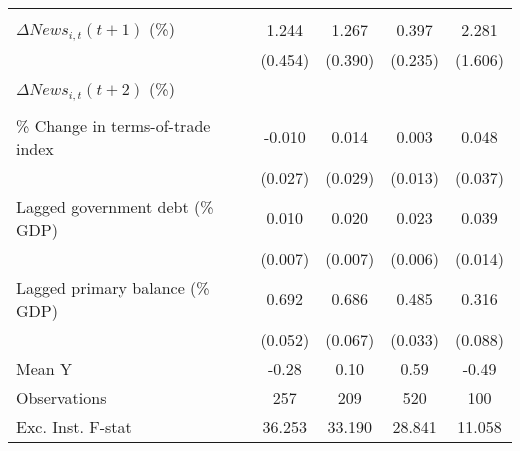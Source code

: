 {\begin{tabular}{l*{4}{c}}
                    &                     &                     &                     &                     \\
\addlinespace
$ \Delta News_{i,t}(t+1)$ (\%)&       1.244\sym{***}&       1.267\sym{***}&       0.397\sym{*}  &       2.281         \\
                    &     (0.454)         &     (0.390)         &     (0.235)         &     (1.606)         \\
\addlinespace
$ \Delta News_{i,t}(t+2)$ (\%)&                     &                     &                     &                     \\
                    &                     &                     &                     &                     \\
\addlinespace
\% Change in terms-of-trade index&      -0.010         &       0.014         &       0.003         &       0.048         \\
                    &     (0.027)         &     (0.029)         &     (0.013)         &     (0.037)         \\
\addlinespace
Lagged government debt (\% GDP)&       0.010         &       0.020\sym{***}&       0.023\sym{***}&       0.039\sym{***}\\
                    &     (0.007)         &     (0.007)         &     (0.006)         &     (0.014)         \\
\addlinespace
Lagged primary balance (\% GDP)&       0.692\sym{***}&       0.686\sym{***}&       0.485\sym{***}&       0.316\sym{***}\\
                    &     (0.052)         &     (0.067)         &     (0.033)         &     (0.088)         \\
\midrule
Mean Y              &       -0.28         &        0.10         &        0.59         &       -0.49         \\
Observations        &         257         &         209         &         520         &         100         \\
Exc. Inst. F-stat   &      36.253         &      33.190         &      28.841         &      11.058         \\
\bottomrule
\end{tabular}
}
